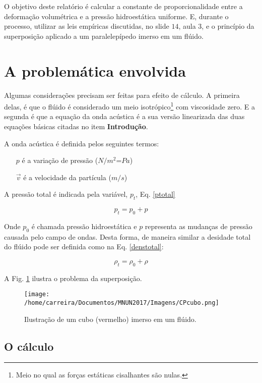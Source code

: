\documentclass[12pt,a4paper,final]{report}%
\begin{document}
O objetivo deste relatório é calcular a constante de proporcionalidade entre a deformação volumétrica e a pressão hidroestática uniforme. E, durante o processo, utilizar as leis empíricas discutidas, no slide $14$, aula $3$, e o princípio da superposição aplicado a um paralelepípedo imerso em um flúido.



\section*{A problemática envolvida}

Algumas considerações precisam ser feitas para efeito de cálculo. A primeira delas, é que o flúido é considerado um meio isotrópico\footnote{Meio no qual as forças estáticas cisalhantes são nulas.} com viscosidade zero. E a segunda é que a equação da onda acústica é a sua versão linearizada das duas equações básicas citadas no item \textbf{Introdução}.

A onda acústica é definida pelos seguintes termos:

\begin{itemize}
\item[$p$] é a variação de pressão ($N/m^{2}$=$Pa$)
\item[$\vec{v}$] é a velocidade da partícula ($m/s$)
\end{itemize}

A pressão total é indicada pela variável, $p_{t}$, Eq. \ref{ptotal}

\begin{equation}
p_{t}=p_{0}+p
\label{ptotal}
\end{equation}

Onde $p_{0}$ é chamada pressão hidroestática e $p$ representa as mudanças de pressão causada pelo campo de ondas. Desta forma, de maneira similar a desidade total do flúido pode ser definida como na Eq. \ref{denstotal}:

\begin{equation}
\rho_{t}=\rho_{0}+\rho
\label{denstotal}
\end{equation}

A Fig. \ref{fig1} ilustra o problema da superposição.

\begin{figure}[H]
\centering
\texttt{[image: /home/carreira/Documentos/MNUN2017/Imagens/CPcubo.png]}
\caption{Ilustração de um cubo (vermelho) imerso em um flúido.}
\label{fig1}
\end{figure}


\subsection*{O cálculo}





\end{document}
